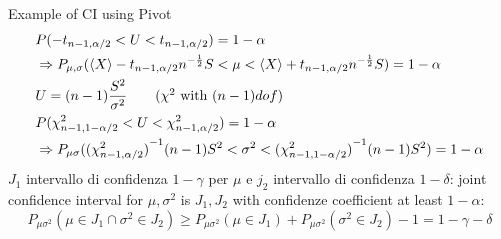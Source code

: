 \documentclass[asd-beamer.tex]{subfiles}%
\begin{document}
\begin{frame}[allowframebreaks]{Example of CI using Pivot}
\begin{align*}
	&P(-t_{n-1,\alpha/2}<U<t_{n-1,\alpha/2})=1-\alpha\\
	&\Rightarrow P_{\mu,\sigma}(\langle X \rangle-t_{n-1,\alpha/2}n^{-\frac{1}{2}}S<\mu<\langle X \rangle+t_{n-1,\alpha/2}n^{-\frac{1}{2}}S)=1-\alpha\\
	&U=(n-1)\frac{S^2}{\sigma^2}\tag{$\chi^2$ with $(n-1) dof$}\\
	&P(\chi^2_{n-1,1-\alpha/2}<U<\chi^2_{n-1,\alpha/2})=1-\alpha\\
	&\Rightarrow P_{\mu\sigma}({(\chi^2_{n-1,\alpha/2})}^{-1}(n-1)S^2<\sigma^2<{(\chi^2_{n-1,1-\alpha/2})}^{-1}(n-1)S^2)=1-\alpha
	\end{align*}
	$J_1$ intervallo di confidenza $1-\gamma$ per $\mu$ e $j_2$ intervallo di confidenza $1-\delta$: joint confidence interval for $\mu,\sigma^2$ is ${J_1,J_2}$ with confidenze coefficient at least $1-\alpha$:
	\[P_{\mu\sigma^2}(\mu\in J_1\cap\sigma^2\in J_2)\geq P_{\mu\sigma^2}(\mu\in J_1)+P_{\mu\sigma^2}(\sigma^2\in J_2)-1=1-\gamma-\delta\]
\end{frame}
\end{document}
